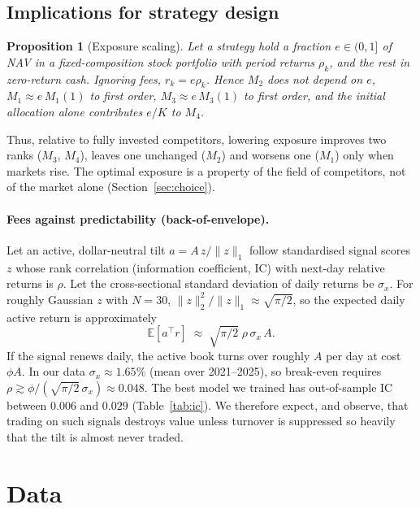 \documentclass[11pt,a4paper]{article}
\newcommand{\E}{\mathbb{E}}
\newtheorem{proposition}{Proposition}
\begin{document}
\subsection{Implications for strategy design}\label{sec:implications}

\begin{proposition}[Exposure scaling]\label{prop:scaling}
Let a strategy hold a fraction $e\in(0,1]$ of NAV in a fixed-composition stock portfolio with period returns $\rho_k$,
and the rest in zero-return cash. Ignoring fees, $r_k=e\rho_k$. Hence $M_2$ does not depend on $e$, $M_1\approx e\,M_1(1)$
to first order, $M_3\approx e\,M_3(1)$ to first order, and the initial allocation alone contributes $e/K$ to $M_4$.
\end{proposition}
\noindent
Thus, relative to fully invested competitors, lowering exposure improves two ranks ($M_3$, $M_4$), leaves one
unchanged ($M_2$) and worsens one ($M_1$) only when markets rise. The optimal exposure is a property of the field of
competitors, not of the market alone (Section~\ref{sec:choice}).

\paragraph{Fees against predictability (back-of-envelope).}
Let an active, dollar-neutral tilt $a=A\,z/\|z\|_1$ follow standardised signal scores $z$ whose rank correlation
(information coefficient, IC) with next-day relative returns is $\rho$. Let the cross-sectional standard deviation of
daily returns be $\sigma_x$. For roughly Gaussian $z$ with $N=30$, $\|z\|_2^2/\|z\|_1\approx\sqrt{\pi/2}$, so the
expected daily active return is approximately
\begin{equation}
  \E[a^\top r]\;\approx\;\sqrt{\pi/2}\;\rho\,\sigma_x\,A .
\end{equation}
If the signal renews daily, the active book turns over roughly $A$ per day at cost $\phi A$. In our data
$\sigma_x\approx1.65\%$ (mean over 2021--2025), so break-even requires $\rho\gtrsim\phi/(\sqrt{\pi/2}\,\sigma_x)\approx0.048$.
The best model we trained has out-of-sample IC between $0.006$ and $0.029$ (Table~\ref{tab:ic}). We therefore expect,
and observe, that trading on such signals destroys value unless turnover is suppressed so heavily that the tilt is
almost never traded.

\section{Data}\label{sec:data}
\end{document}
